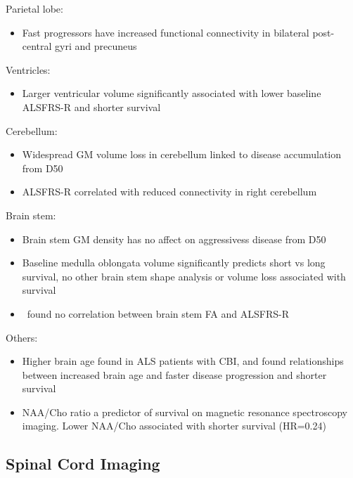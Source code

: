 Parietal lobe:
\begin{itemize}
    \item Fast progressors have increased functional connectivity in bilateral post-central gyri and precuneus~\cite{trojsiRestingStateFunctional2021}
\end{itemize}

Ventricles:
\begin{itemize}
    \item Larger ventricular volume significantly associated with lower baseline ALSFRS-R and shorter survival~\cite{westenengSubcorticalStructuresAmyotrophic2015}
\end{itemize}

Cerebellum:
\begin{itemize}
    \item Widespread GM volume loss in cerebellum linked to disease accumulation from D50~\cite{dieckmannCorticalSubcorticalGrey2022}
    \item ALSFRS-R correlated with reduced connectivity in right cerebellum~\cite{agostaSensorimotorFunctionalConnectivity2011}
\end{itemize}

Brain stem:
\begin{itemize}
    \item Brain stem GM density has no affect on aggressivess disease from D50~\cite{steinbachApplyingD50Disease2020}
    \item Baseline medulla oblongata volume significantly predicts short vs long survival, no other brain stem shape analysis or volume loss associated with survival~\cite{milellaMedullaOblongataVolume2022}
    \item \cite{mullerLargescaleMulticentreCerebral2016}~found no correlation between brain stem FA and ALSFRS-R
\end{itemize}


Others:
\begin{itemize}
    \item Higher brain age found in ALS patients with CBI, and found relationships between increased brain age and faster disease progression and shorter survival~\cite{hermannCognitiveBehaviouralNot2022}
    \item NAA/Cho ratio a predictor of survival on magnetic resonance spectroscopy imaging. Lower NAA/Cho associated with shorter survival (HR=0.24)~\cite{kalraCerebralDegenerationPredicts2006}
\end{itemize}

\subsection{Spinal Cord Imaging}

